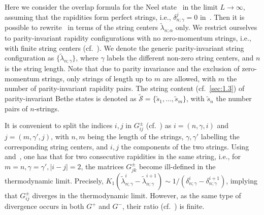 \documentclass[11pt]{iopart}
\begin{document}
Here we consider the overlap formula for the Neel state~ in the 
limit $L\to\infty$, assuming that the rapidities form perfect strings, i.e., 
$\delta_{n;\gamma}^j=0$ in~. Then it is possible to 
rewrite~ in terms of the string centers $\tilde\lambda_{n;\alpha}$ 
only. We restrict ourselves to parity-invariant rapidity configurations with no 
zero-momentum strings, i.e., with finite string centers (cf.~). 
We denote the generic parity-invariant string configuration as $\{\tilde
\lambda_{n;\gamma}\}$, where $\gamma$ labels the different non-zero string 
centers, and $n$ is the string length. Note that due to parity invariance and 
the exclusion of zero-momentum strings, only strings of length up to $m$ are 
allowed, with $m$ the number of parity-invariant rapidity pairs. The string 
content (cf.~\ref{sec:1.3}) of parity-invariant Bethe states is denoted as 
$\widetilde{\mathcal S}=\{\tilde s_1,\dots,\tilde s_{m}\}$, with $\tilde s_n$ 
the number pairs of $n$-strings. 

It is convenient to split the indices $i,j$ in $G^\pm_{ij}$ (cf.~) as 
$i=(n,\gamma,i)$ and $j=(m,\gamma',j)$, with $n,m$ being the length of the strings, 
$\gamma,\gamma'$ labelling the corresponding string centers, and $i,j$ the components 
of the two strings. Using~ and~, one has that for two consecutive 
rapidities in the same string, i.e., for $m=n,\gamma=\gamma',|i-j|=2$, the matrices 
$G^{\pm}_{jk}$ become ill-defined in the thermodynamic limit. Precisely, $K_{1}(\tilde
\lambda_{n;\gamma}^i-\tilde\lambda_{n;\gamma}^{i+1})\sim 1/(\delta_{n;\gamma}^i-
\delta_{n;\gamma}^{i+1})$, implying that $G_{ij}^\pm$ diverges in the thermodynamic 
limit. However, as the same type of divergence occurs in both $G^+$ and $G^-$, their 
ratio (cf.~) is finite. 
\end{document}
